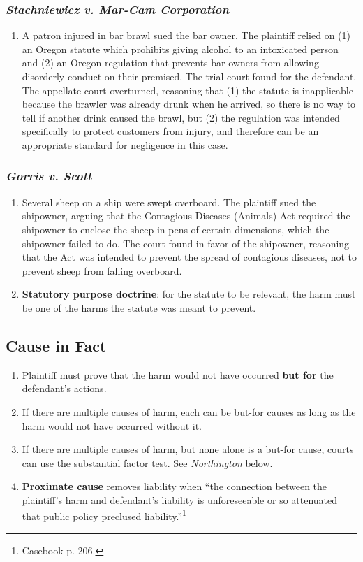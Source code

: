 \subsubsection{\emph{Stachniewicz v. Mar-Cam Corporation}}

\begin{enumerate}
    \item A patron injured in bar brawl sued the bar owner. The plaintiff relied on (1) an Oregon statute which prohibits giving alcohol to an intoxicated person and (2) an Oregon regulation that prevents bar owners from allowing disorderly conduct on their premised. The trial court found for the defendant. The appellate court overturned, reasoning that (1) the statute is inapplicable because the brawler was already drunk when he arrived, so there is no way to tell if another drink caused the brawl, but (2) the regulation was intended specifically to protect customers from injury, and therefore can be an appropriate standard for negligence in this case.
\end{enumerate}

\subsubsection{\emph{Gorris v. Scott}}

\begin{enumerate}
    \item Several sheep on a ship were swept overboard. The plaintiff sued the shipowner, arguing that the Contagious Diseases (Animals) Act required the shipowner to enclose the sheep in pens of certain dimensions, which the shipowner failed to do. The court found in favor of the shipowner, reasoning that the Act was intended to prevent the spread of contagious diseases, not to prevent sheep from falling overboard.
    \item \textbf{Statutory purpose doctrine}: for the statute to be relevant, the harm must be one of the harms the statute was meant to prevent.
\end{enumerate}

\subsection{Cause in Fact}

\begin{enumerate}
    \item Plaintiff must prove that the harm would not have occurred \textbf{but for} the defendant's actions.
    \item If there are multiple causes of harm, each can be but-for causes as long as the harm would not have occurred without it.
    \item If there are multiple causes of harm, but none alone is a but-for cause, courts can use the substantial factor test. See \emph{Northington} below.
    \item \textbf{Proximate cause} removes liability when ``the connection between the plaintiff's harm and defendant's liability is unforeseeable or so attenuated that public policy preclused liability.''\footnote{Casebook p. 206.}
\end{enumerate}

